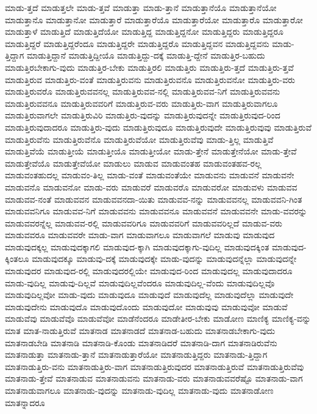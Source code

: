 {ಮಾಡು-ತ್ತದೆ
ಮಾಡುತ್ತಲೇ
ಮಾಡು-ತ್ತವೆ
ಮಾಡುತ್ತಾ
ಮಾಡು-ತ್ತಾನೆ
ಮಾಡುತ್ತಾನೆಯೊ
ಮಾಡುತ್ತಾನೆಯೋ
ಮಾಡುತ್ತಾನೊ
ಮಾಡುತ್ತಾನೋ
ಮಾಡುತ್ತಾರೆ
ಮಾಡುತ್ತಾರೆಯೊ
ಮಾಡುತ್ತಾರೆಯೋ
ಮಾಡುತ್ತಾರೊ
ಮಾಡುತ್ತಾರೋ
ಮಾಡುತ್ತಾಳೆ
ಮಾಡುತ್ತಿದೆ
ಮಾಡುತ್ತಿದೆಯೋ
ಮಾಡುತ್ತಿದ್ದ
ಮಾಡುತ್ತಿದ್ದನೋ
ಮಾಡುತ್ತಿದ್ದರು
ಮಾಡುತ್ತಿದ್ದರೂ
ಮಾಡುತ್ತಿದ್ದರೆ
ಮಾಡುತ್ತಿದ್ದರೆಂದೂ
ಮಾಡುತ್ತಿದ್ದರೇ
ಮಾಡುತ್ತಿದ್ದರೊ
ಮಾಡುತ್ತಿದ್ದವನ
ಮಾಡುತ್ತಿದ್ದವನು
ಮಾಡು-ತ್ತಿದ್ದಾಗ
ಮಾಡುತ್ತಿದ್ದಾನೆ
ಮಾಡುತ್ತಿದ್ದೀಯೊ
ಮಾಡುತ್ತಿದ್ದು-ದಕ್ಕೆ
ಮಾಡುತ್ತಿ-ದ್ದೇನೆ
ಮಾಡುತ್ತಿರ-ಬಹುದು
ಮಾಡುತ್ತಿರಬೇಕಾಗು-ವುದು
ಮಾಡುತ್ತಿರ-ಬೇಕು
ಮಾಡುತ್ತಿರಲಿ
ಮಾಡುತ್ತಿರು
ಮಾಡುತ್ತಿರು-ತ್ತದೆ
ಮಾಡುತ್ತಿರು-ತ್ತವೆ
ಮಾಡುತ್ತಿರುವ
ಮಾಡುತ್ತಿರು-ವಂತೆ
ಮಾಡುತ್ತಿರುವನು
ಮಾಡುತ್ತಿರುವನೊ
ಮಾಡುತ್ತಿರುವನೋ
ಮಾಡುತ್ತಿರು-ವರು
ಮಾಡುತ್ತಿರುವರೊ
ಮಾಡುತ್ತಿರುವವನಲ್ಲ
ಮಾಡುತ್ತಿರುವವ-ನಲ್ಲಿ
ಮಾಡುತ್ತಿರುವವ-ನಿಗೆ
ಮಾಡುತ್ತಿರುವವನು
ಮಾಡುತ್ತಿರುವವನೂ
ಮಾಡುತ್ತಿರುವವರಿಗೆ
ಮಾಡುತ್ತಿರುವ-ವರು
ಮಾಡುತ್ತಿರು-ವಾಗ
ಮಾಡುತ್ತಿರುವಾಗಲೂ
ಮಾಡುತ್ತಿರುವಾಗಲೇ
ಮಾಡುತ್ತಿರುವಿರಿ
ಮಾಡುತ್ತಿರು-ವುದನ್ನು
ಮಾಡುತ್ತಿರುವುದನ್ನೇ
ಮಾಡುತ್ತಿರುವುದ-ರಿಂದ
ಮಾಡುತ್ತಿರುವುದಾದರೂ
ಮಾಡುತ್ತಿರು-ವುದು
ಮಾಡುತ್ತಿರುವುದೂ
ಮಾಡುತ್ತಿರುವುದೇ
ಮಾಡುತ್ತಿರುವುವು
ಮಾಡುತ್ತಿರುವೆ
ಮಾಡುತ್ತಿರುವೆನು
ಮಾಡುತ್ತಿರುವೆನೊ
ಮಾಡುತ್ತಿರುವೆಯೋ
ಮಾಡುತ್ತಿರುವೆವು
ಮಾಡು-ತ್ತಿಲ್ಲ
ಮಾಡುತ್ತಿವೆ
ಮಾಡುತ್ತಿವೆಯೆ
ಮಾಡುತ್ತೀಯೆ
ಮಾಡುತ್ತೀಯೊ
ಮಾಡುತ್ತೀಯೋ
ಮಾಡು-ತ್ತೇನೆ
ಮಾಡುತ್ತೇನೆಯೋ
ಮಾಡು-ತ್ತೇವೆ
ಮಾಡುತ್ತೇವೆಯೊ
ಮಾಡುತ್ತೇವೆಯೋ
ಮಾಡುಲು
ಮಾಡುವ
ಮಾಡುವಂತಹ
ಮಾಡುವಂತಹವ-ರಲ್ಲ
ಮಾಡುವಂತಹುದಲ್ಲ
ಮಾಡುವಂ-ತಿಲ್ಲ
ಮಾಡು-ವಂತೆ
ಮಾಡುವಂತೆಯೇ
ಮಾಡುವನು
ಮಾಡುವನೆ
ಮಾಡುವನೇ
ಮಾಡುವನೊ
ಮಾಡುವನೋ
ಮಾಡು-ವರು
ಮಾಡುವರೆ
ಮಾಡುವರೊ
ಮಾಡುವರೋ
ಮಾಡುವಳು
ಮಾಡುವವ
ಮಾಡುವವ-ನಂತೆ
ಮಾಡುವವನ
ಮಾಡುವವನದಾ-ಯಿತು
ಮಾಡುವವ-ನನ್ನು
ಮಾಡುವವನಲ್ಲ
ಮಾಡುವವನಿ-ಗಿಂತ
ಮಾಡುವವನಿಗೂ
ಮಾಡುವವ-ನಿಗೆ
ಮಾಡುವವನು
ಮಾಡುವವನೂ
ಮಾಡುವವನೆ
ಮಾಡುವವನೇ
ಮಾಡು-ವವರನ್ನು
ಮಾಡುವವರನ್ನೆಲ್ಲ
ಮಾಡುವವ-ರಲ್ಲಿ
ಮಾಡುವವರಿಗೂ
ಮಾಡುವವರಿಗೆ
ಮಾಡುವವರಿಲ್ಲದೆ
ಮಾಡುವ-ವರು
ಮಾಡುವವರೂ
ಮಾಡುವವರೇ
ಮಾಡು-ವಾಗ
ಮಾಡುವಾಗಲೂ
ಮಾಡುವಾಗಲೆ
ಮಾಡುವು
ಮಾಡುವುದ
ಮಾಡುವುದಕ್ಕಲ್ಲ
ಮಾಡುವುದಕ್ಕಾಗಲಿ
ಮಾಡುವುದ-ಕ್ಕಾಗಿ
ಮಾಡುವುದಕ್ಕಾಗು-ವುದಿಲ್ಲ
ಮಾಡುವುದಕ್ಕಿಂತ
ಮಾಡುವುದ-ಕ್ಕಿಂತಲೂ
ಮಾಡುವುದಕ್ಕೂ
ಮಾಡುವು-ದಕ್ಕೆ
ಮಾಡುವುದಕ್ಕೇ
ಮಾಡು-ವುದನ್ನು
ಮಾಡುವುದನ್ನೆಲ್ಲಾ
ಮಾಡುವುದನ್ನೇ
ಮಾಡುವುದರ
ಮಾಡುವುದ-ರಲ್ಲಿ
ಮಾಡುವುದರಲ್ಲಿಯೇ
ಮಾಡುವುದ-ರಿಂದ
ಮಾಡುವುದಲ್ಲ
ಮಾಡುವುದಾದರೂ
ಮಾಡು-ವುದಿಲ್ಲ
ಮಾಡುವು-ದಿಲ್ಲವೆ
ಮಾಡುವುದಿಲ್ಲವೆಂದರೂ
ಮಾಡುವುದಿಲ್ಲ-ವೆಂದು
ಮಾಡುವುದಿಲ್ಲವೊ
ಮಾಡುವುದಿಲ್ಲವೋ
ಮಾಡು-ವುದು
ಮಾಡುವುದೂ
ಮಾಡುವುದೆ
ಮಾಡುವುದೆಲ್ಲ
ಮಾಡುವುದೆಲ್ಲಾ
ಮಾಡುವುದೇ
ಮಾಡುವುದೇನು
ಮಾಡುವುದೊ
ಮಾಡುವುದೊಂದು
ಮಾಡುವುದೋ
ಮಾಡುವುವು
ಮಾಡುವುವೋ
ಮಾಡುವೆ
ಮಾಡುವೆವು
ಮಾಡುವೆವೊ
ಮಾಡುವೆವೋ
ಮಾಡೆನೆಂದರೂ
ಮಾಡೇತೀರ-ಬೇಕು
ಮಾಡೋಣ
ಮಾಣಿಕ್ಯ
ಮಾಣಿಕ್ಯ-ವನ್ನು
ಮಾತ
ಮಾತ-ನಾಡುತ್ತಿರುವೆ
ಮಾತನಾಡ
ಮಾತನಾಡದೆ
ಮಾತನಾಡ-ಬಹುದು
ಮಾತನಾಡಬೇಕಾಗು-ವುದು
ಮಾತನಾಡಬೇಡಿ
ಮಾತನಾಡಿ
ಮಾತನಾಡಿ-ಕೊಂಡು
ಮಾತನಾಡಿದರೆ
ಮಾತನಾಡಿ-ದಾಗ
ಮಾತನಾಡಿರುವೆನು
ಮಾತನಾಡುತ್ತಾ
ಮಾತನಾಡು-ತ್ತಾನೆ
ಮಾತನಾಡುತ್ತಾರೆಯೋ
ಮಾತನಾಡುತ್ತಿದ್ದರು
ಮಾತನಾಡು-ತ್ತಿದ್ದಾಗ
ಮಾತನಾಡುತ್ತಿರು-ವನು
ಮಾತನಾಡುತ್ತಿರು-ವಾಗ
ಮಾತನಾಡುತ್ತಿರುವುದರ
ಮಾತನಾಡುತ್ತಿರುವೆ
ಮಾತನಾಡುತ್ತಿರುವೆವು
ಮಾತನಾಡು-ತ್ತೇವೆ
ಮಾತನಾಡುವ
ಮಾತನಾಡುವನು
ಮಾತನಾಡು-ವರು
ಮಾತನಾಡುವವರೆಷ್ಟೊ
ಮಾತನಾಡು-ವಾಗ
ಮಾತನಾಡುವಾಗಲೂ
ಮಾತನಾಡು-ವುದನ್ನು
ಮಾತನಾಡು-ವುದಿಲ್ಲ
ಮಾತನಾಡು-ವುದು
ಮಾತನಾಡೋಣ
ಮಾತನ್ನಾದರೂ
}

